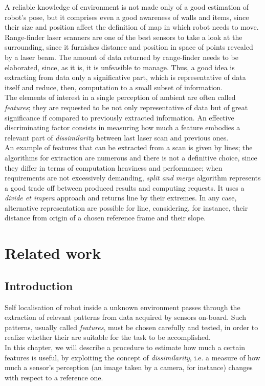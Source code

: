\documentclass[a4paper, onecolumn]{report}
\begin{document}
A reliable knowledge of environment is not made only of a good estimation of robot's pose, but it comprises even a good awareness of walls and items, since their size and position affect the definition of map in which robot needs to move. \\
Range-finder laser scanners are one of the best sensors to take a look at the surrounding, since it furnishes distance and position in space of points revealed by a laser beam. The amount of data returned by range-finder needs to be elaborated, since, as it is, it is unfeasible to manage. Thus, a good idea is extracting from data only a significative part, which is representative of data itself and reduce, then, computation to a small subset of information. \\
The elements of interest in a single perception of ambient are often called \emph{features}; they are requested to be not only representative of data but of great significance if compared to previously extracted information. An effective discriminating factor consists in measuring how much a feature embodies a relevant part of \emph{dissimilarity} between last laser scan and previous ones. \\
An example of features that can be extracted from a scan is given by lines; the algorithms for extraction are numerous and there is not a definitive choice, since they differ in terms of computation heaviness and performance; when requirements are not excessively demanding, \emph{split and merge} algorithm represents a good trade off between produced results and computing requests. It uses a \emph{divide et impera} approach and returns line by their extremes. In any case, alternative representation are possible for line, considering, for instance, their distance from origin of a chosen reference frame and their slope.

\chapter{Related work}
\section{Introduction}
Self localisation of robot inside a unknown environment passes through the extraction of relevant patterns from data acquired by sensors on-board. Such patterns, usually called \emph{features}, must be chosen carefully and tested, in order to realize whether their are suitable for the task to be accomplished. \\
In this chapter, we will describe a procedure to estimate how much a certain features is useful, by exploiting the concept of \emph{dissimilarity}, i.e. a measure of how much a sensor's perception (an image taken by a camera, for instance) changes with respect to a reference one.
\end{document}
